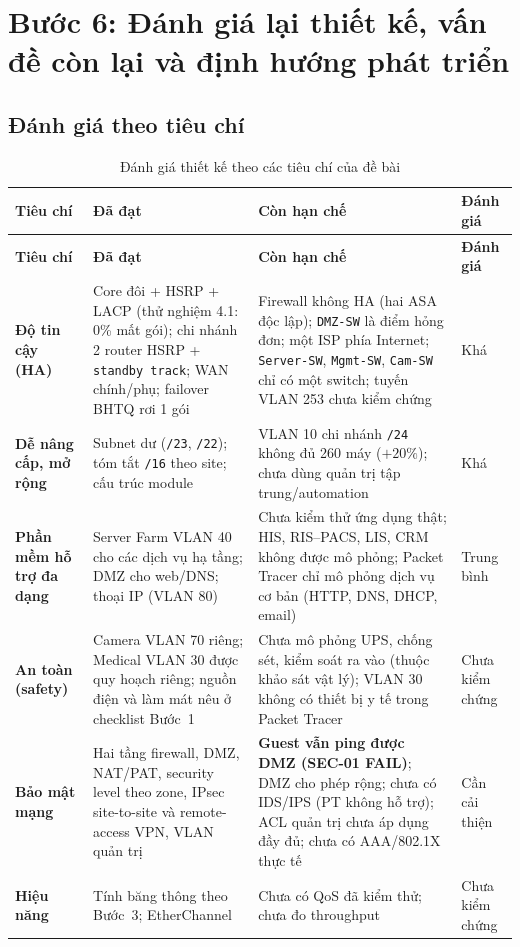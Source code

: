 \section{Bước 6: Đánh giá lại thiết kế, vấn đề còn lại và định hướng phát triển}
\label{sec:step6}

\subsection{Đánh giá theo tiêu chí}
\begin{small}
\setlength{\tabcolsep}{3pt}
\begin{longtable}{|p{2.2cm}|p{4.6cm}|p{4.8cm}|p{1.9cm}|}
\caption{Đánh giá thiết kế theo các tiêu chí của đề bài} \label{tab:evaluation} \\
\hline
\textbf{Tiêu chí} & \textbf{Đã đạt} & \textbf{Còn hạn chế} & \textbf{Đánh giá} \\ \hline
\endfirsthead
\hline \textbf{Tiêu chí} & \textbf{Đã đạt} & \textbf{Còn hạn chế} & \textbf{Đánh giá} \\ \hline
\endhead
\textbf{Độ tin cậy (HA)} & Core đôi + HSRP + LACP (thử nghiệm 4.1: 0\% mất gói); chi nhánh 2 router HSRP + \texttt{standby track}; WAN chính/phụ; failover BHTQ rơi 1 gói & Firewall không HA (hai ASA độc lập); \texttt{DMZ-SW} là điểm hỏng đơn; một ISP phía Internet; \texttt{Server-SW}, \texttt{Mgmt-SW}, \texttt{Cam-SW} chỉ có một switch; tuyến VLAN 253 chưa kiểm chứng & Khá \\ \hline
\textbf{Dễ nâng cấp, mở rộng} & Subnet dư (\texttt{/23}, \texttt{/22}); tóm tắt \texttt{/16} theo site; cấu trúc module & VLAN 10 chi nhánh \texttt{/24} không đủ 260 máy ($+20\%$); chưa dùng quản trị tập trung/automation & Khá \\ \hline
\textbf{Phần mềm hỗ trợ đa dạng} & Server Farm VLAN 40 cho các dịch vụ hạ tầng; DMZ cho web/DNS; thoại IP (VLAN 80) & Chưa kiểm thử ứng dụng thật; HIS, RIS--PACS, LIS, CRM không được mô phỏng; Packet Tracer chỉ mô phỏng dịch vụ cơ bản (HTTP, DNS, DHCP, email) & Trung bình \\ \hline
\textbf{An toàn (safety)} & Camera VLAN 70 riêng; Medical VLAN 30 được quy hoạch riêng; nguồn điện và làm mát nêu ở checklist Bước~1 & Chưa mô phỏng UPS, chống sét, kiểm soát ra vào (thuộc khảo sát vật lý); VLAN 30 không có thiết bị y tế trong Packet Tracer & Chưa kiểm chứng \\ \hline
\textbf{Bảo mật mạng} & Hai tầng firewall, DMZ, NAT/PAT, security level theo zone, IPsec site-to-site và remote-access VPN, VLAN quản trị & \textbf{Guest vẫn ping được DMZ (SEC-01 FAIL)}; DMZ cho phép rộng; chưa có IDS/IPS (PT không hỗ trợ); ACL quản trị chưa áp dụng đầy đủ; chưa có AAA/802.1X thực tế & Cần cải thiện \\ \hline
\textbf{Hiệu năng} & Tính băng thông theo Bước~3; EtherChannel & Chưa có QoS đã kiểm thử; chưa đo throughput & Chưa kiểm chứng \\ \hline
\end{longtable}
\end{small}

